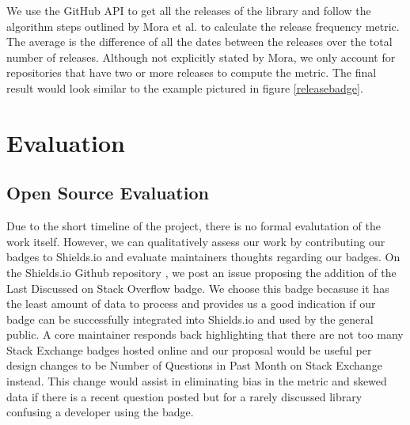 \documentclass[12pt, letterpaper]{article}
\begin{document}
We use the GitHub \cite{github} API to get all the releases of the library and follow the algorithm
steps outlined by Mora et al. \cite{metrics} to calculate the release frequency metric.
The average is the difference of all the dates between the releases over the total number of releases.
Although not explicitly stated by Mora, we only account for repositories that have two or more releases to compute
the metric. The final result would look similar to the example pictured in figure \ref{releasebadge}.


\section{Evaluation}

\subsection{Open Source Evaluation}

Due to the short timeline of the project, there is no formal evalutation of the work itself.
However, we can qualitatively assess our work by contributing our badges to Shields.io \cite{shields}
and evaluate maintainers thoughts regarding our badges. On the Shields.io Github repository \cite{shieldsrepo}, 
we post an issue \cite{shieldsissue} proposing the addition of the Last Discussed on Stack Overflow badge.
We choose this badge becasuse it has the least amount of data to process and provides us a good indication
if our badge can be successfully integrated into Shields.io \cite{shields} and used by the general public.
A core maintainer responds back highlighting that there are not too many Stack Exchange badges hosted online
and our proposal would be
useful per design changes to be Number of Questions in Past Month on Stack Exchange instead. 
This change would assist in eliminating bias in the metric and skewed data if there is a recent question posted but
for a rarely discussed library confusing a developer using the badge.
\end{document}
